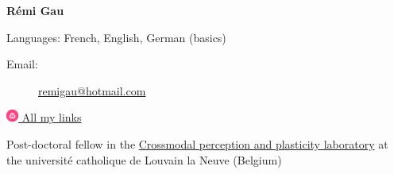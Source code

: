 \documentclass[a4paper,12pt,oneside]{letter}
\date{2021-04-10}
\begin{document}
\textbf{{\LARGE Rémi Gau}}

Languages: French, English, German (basics)

\doubleline

\begin{minipage}{.49\textwidth}
\begin{description}
    \item[Email:]
        \href{mailto:remi\textunderscore gau@hotmail.com}
            {remi\textunderscore gau@hotmail.com}
 \end{description}
\end{minipage}
\begin{minipage}{.49\textwidth}
\begin{description}
    \item[\href{https://allmylinks.com/remi-gau}
                {\includegraphics[width=0.4cm]{./images/allmylinks.png} All my links}]
\end{description}
\end{minipage}
\vspace{10pt}

\doubleline


{



Post-doctoral fellow in the \href{https://cpplab.be/}{Crossmodal perception and plasticity laboratory}
at the université catholique de Louvain la Neuve (Belgium)























% 

}
\end{document}
